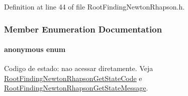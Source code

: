 Definition at line 44 of file RootFindingNewtonRhapson.h.

\subsubsection{Member Enumeration Documentation}
\hypertarget{structRootFindingNewtonRhapson_c62450d4b2b4edfb33a87f8666ecc1b1}{
\paragraph["@6]{\setlength{\rightskip}{0pt plus 5cm}anonymous enum}\hfill}
\label{structRootFindingNewtonRhapson_c62450d4b2b4edfb33a87f8666ecc1b1}


Codigo de estado: nao acessar diretamente. Veja \hyperlink{group____newton_g9d87a4beccc7b61365f6b680fc1a4355}{RootFindingNewtonRhapsonGetStateCode} e \hyperlink{group____newton_g70436f650ac07866bb8d9897908f4422}{RootFindingNewtonRhapsonGetStateMessage}. 

